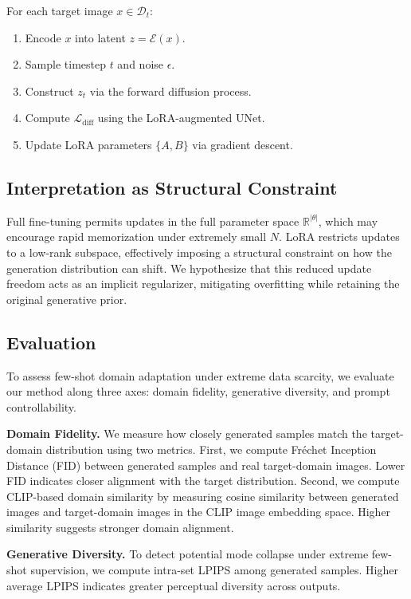 \documentclass{article}
\begin{document}
For each target image $x \in \mathcal{D}_t$:
\begin{enumerate}
    \item Encode $x$ into latent $z = \mathcal{E}(x)$.
    \item Sample timestep $t$ and noise $\epsilon$.
    \item Construct $z_t$ via the forward diffusion process.
    \item Compute $\mathcal{L}_{\text{diff}}$ using the LoRA-augmented UNet.
    \item Update LoRA parameters $\{A,B\}$ via gradient descent.
\end{enumerate}

\subsection{Interpretation as Structural Constraint}

Full fine-tuning permits updates in the full parameter space $\mathbb{R}^{|\theta|}$, which may encourage rapid memorization under extremely small $N$. 
LoRA restricts updates to a low-rank subspace, effectively imposing a structural constraint on how the generation distribution can shift. 
We hypothesize that this reduced update freedom acts as an implicit regularizer, mitigating overfitting while retaining the original generative prior.

\subsection{Evaluation}

To assess few-shot domain adaptation under extreme data scarcity, we evaluate our method along three axes: domain fidelity, generative diversity, and prompt controllability.

\textbf{Domain Fidelity.}
We measure how closely generated samples match the target-domain distribution using two metrics. 
First, we compute Fréchet Inception Distance (FID) between generated samples and real target-domain images. Lower FID indicates closer alignment with the target distribution. 
Second, we compute CLIP-based domain similarity by measuring cosine similarity between generated images and target-domain images in the CLIP image embedding space. Higher similarity suggests stronger domain alignment.

\textbf{Generative Diversity.}
To detect potential mode collapse under extreme few-shot supervision, we compute intra-set LPIPS among generated samples. Higher average LPIPS indicates greater perceptual diversity across outputs.
\end{document}
